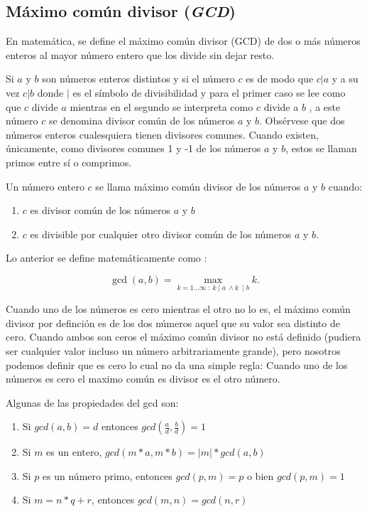 \subsection{Máximo común divisor (\emph{GCD})}

En matemática, se define el máximo común divisor (GCD) de dos o más números enteros al mayor número entero que los divide sin dejar resto.

Si $a$ y $b$ son números enteros distintos y si el número $c$ es de modo que $c|a$ y a su vez $c|b$  donde $|$ es el símbolo de divisibilidad y para el primer caso se lee como que $c$ divide $a$ mientras en el segundo se interpreta como $c$ divide a $b$ , a este número $c$ se denomina divisor común de los números $a$ y $b$. Obsérvese que dos números enteros cualesquiera tienen divisores comunes. Cuando existen, únicamente, como divisores comunes 1 y -1 de los números $a$ y $b$, estos se llaman primos entre sí o comprimos.

Un número entero $c$ se llama máximo común divisor de los números $a$ y $b$ cuando:
\begin{enumerate}
	\item $c$ es divisor común de los números $a$ y $b$
	\item $c$ es divisible por cualquier otro divisor común de los números $a$ y $b$.
\end{enumerate}

Lo anterior se define matemáticamente como :

$$\gcd(a, b) = \max_ {k = 1 \dots \infty ~ : ~ k \mid a ~ \wedge k ~ \mid b} k.$$

Cuando uno de los números es cero mientras el otro no lo es, el máximo común divisor por definción es de los dos números aquel que su valor sea distinto de cero. Cuando ambos son ceros el máximo común divisor no está definido (pudiera ser cualquier valor incluso un número arbitrariamente grande), pero nosotros podemos definir que es cero lo cual no da una simple regla: Cuando uno de los números es cero el maximo común es divisor es el otro número.

Algunas de las propiedades del gcd son:

\begin{enumerate}
	\item Si $gcd(a,b)=d$ entonces $gcd(\frac{a}{d},\frac{b}{d})=1 $
	\item Si $m$ es un entero, $gcd(m*a,m*b)=|m|*gcd(a,b)$
	\item Si $p$ es un número primo, entonces $gcd(p,m)=p$ o bien $gcd(p,m)=1$
	\item Si $m= n*q + r$, entonces $gcd(m,n)=gcd(n,r)$
\end{enumerate}


